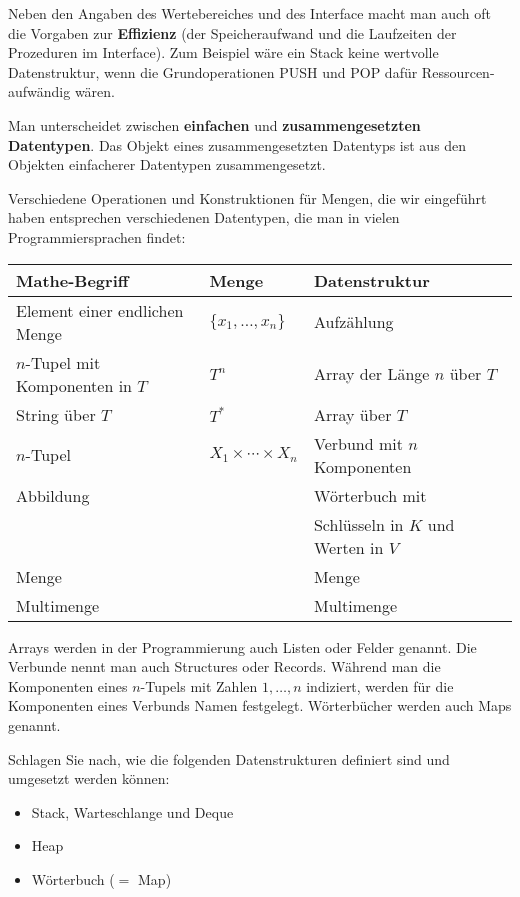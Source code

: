 \begin{bem}
	Neben den Angaben des Wertebereiches und des Interface macht man auch oft die Vorgaben zur \textbf{Effizienz} 	(der Speicheraufwand und die Laufzeiten der Prozeduren im Interface). Zum Beispiel wäre ein Stack keine wertvolle Datenstruktur, wenn die Grundoperationen PUSH und POP dafür Ressourcen-aufwändig wären. 
\end{bem} 

\begin{bem}
	Man unterscheidet zwischen \textbf{einfachen} und \textbf{zusammengesetzten Datentypen}. Das Objekt eines zusammengesetzten Datentyps ist aus den Objekten einfacherer Datentypen zusammengesetzt.  
\end{bem} 

\begin{bem}
	Verschiedene Operationen und Konstruktionen für Mengen, die wir eingeführt haben entsprechen verschiedenen Datentypen, die man in vielen Programmiersprachen findet: 
	\begin{center} 
		\small  
	\begin{tabular}{l|l|l}
			Mathe-Begriff & Menge & Datenstruktur
			\\ \hline 
			Element einer endlichen Menge & $\{x_1,\ldots,x_n\}$ & Aufzählung 
			\\ $n$-Tupel mit Komponenten in $T$ & $T^n$ & Array der Länge $n$ über $T$ 
			\\ String über $T$ & $T^\ast$ & Array über $T$
			\\ $n$-Tupel & $X_1 \times \cdots \times X_n$ & Verbund mit $n$ Komponenten
			\\ Abbildung &  & Wörterbuch mit 
			\\ & & Schlüsseln in $K$ und Werten in $V$
			\\ Menge & & Menge
			\\ Multimenge & & Multimenge 
	\end{tabular} 
	\end{center}
Arrays werden in der Programmierung auch Listen oder Felder genannt. Die Verbunde nennt man auch Structures oder Records. Während man die Komponenten eines $n$-Tupels mit Zahlen $1,\ldots,n$ indiziert, werden für die Komponenten eines Verbunds Namen festgelegt.  Wörterbücher werden auch Maps genannt. 
\end{bem} 

\begin{aufg}
	Schlagen Sie nach, wie die folgenden Datenstrukturen definiert sind und umgesetzt werden können: 
	\begin{itemize}
			\item Stack, Warteschlange und Deque
			\item Heap 
			\item Wörterbuch ($=$ Map)
	\end{itemize} 
\end{aufg} 


